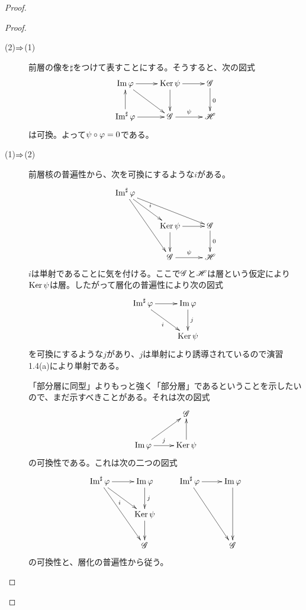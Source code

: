 \begin{proof}
  \begin{proof} ${}$
    \begin{description}
      \item[(2)$\Rightarrow$(1)] 前層の像を$\sharp$をつけて表すことにする。そうすると、次の図式
      \[
      \xymatrix{
      \Im \vp \ar[r]  \ar[rd] & \Ker \psi \ar[r] \ar[d] & \scrg \ar[d]^0 \\
      \Im\sh \vp \ar[r] \ar[u] & \scrg \ar[r]^-{\psi} & \scrh
      }
      \]
      は可換。よって$\psi \circ {\varphi} = 0$である。
      \item[(1)$\Rightarrow$(2)] 前層核の普遍性から、次を可換にするような$i$がある。
      \[
      \xymatrix{
      \Im\sh \vp \ar[rrd] \ar[ddr] \ar[rd]^-{i} & & \\
       & \Ker \psi \ar[r] \ar[d] & \scrg \ar[d]^-{0} \\
       & \scrg \ar[r]^-{\psi} & \scrh
      }
      \]
      $i$は単射であることに気を付ける。ここで$\mathscr{G}$と$\mathscr{H}$は層という仮定により$\operatorname{Ker} \psi$は層。したがって層化の普遍性により次の図式
      \[
      \xymatrix{
      \Im\sh \vp \ar[r] \ar[rd]_-{i} & \Im \vp \ar[d]^-{j} \\
      & \Ker \psi
      }
      \]
      を可換にするような$j$があり、$j$は単射により誘導されているので演習1.4(a)により単射である。

      「部分層に同型」よりもっと強く「部分層」であるということを示したいので、まだ示すべきことがある。それは次の図式
      \[
      \xymatrix{
      & \scrg \\
      \Im \vp \ar[r]^-j \ar[ru] & \Ker \psi \ar[u]
      }
      \]
      の可換性である。これは次の二つの図式
      \[
      \xymatrix{
      \Im\sh \vp \ar[r] \ar[rd]_-i \ar[rdd] & \Im \vp \ar[d]^-j & \Im\sh \vp \ar[r] \ar[rdd] & \Im \vp \ar[dd] \\
      {} & \Ker \psi \ar[d] & {} & { } \\
      {} & \scrg & {} & \scrg
      }
      \]
      の可換性と、層化の普遍性から従う。
    \end{description}
  \end{proof}


\end{proof}
